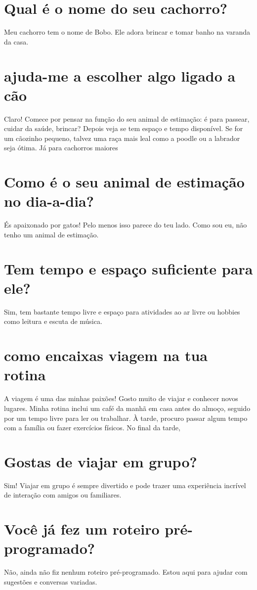 \documentclass[11pt,a4paper]{article}
\begin{document}
\section{Qual é o nome do seu cachorro?}
Meu cachorro tem o nome de Bobo. Ele adora brincar e tomar banho na varanda da casa.

\section{ajuda-me a escolher algo ligado a cão}
Claro! Comece por pensar na função do seu animal de estimação: é para passear, cuidar da saúde, brincar? Depois veja se tem espaço e tempo disponível. Se for um cãozinho pequeno, talvez uma raça mais leal como a poodle ou a labrador seja ótima. Já para cachorros maiores

\section{Como é o seu animal de estimação no dia-a-dia?}
És apaixonado por gatos! Pelo menos isso parece do teu lado. Como sou eu, não tenho um animal de estimação.

\section{Tem tempo e espaço suficiente para ele?}
Sim, tem bastante tempo livre e espaço para atividades ao ar livre ou hobbies como leitura e escuta de música.

\section{como encaixas viagem na tua rotina}
A viagem é uma das minhas paixões! Gosto muito de viajar e conhecer novos lugares. Minha rotina inclui um café da manhã em casa antes do almoço, seguido por um tempo livre para ler ou trabalhar. À tarde, procuro passar algum tempo com a família ou fazer exercícios físicos. No final da tarde,

\section{Gostas de viajar em grupo?}
Sim! Viajar em grupo é sempre divertido e pode trazer uma experiência incrível de interação com amigos ou familiares.

\section{Você já fez um roteiro pré-programado?}
Não, ainda não fiz nenhum roteiro pré-programado. Estou aqui para ajudar com sugestões e conversas variadas.
\end{document}
